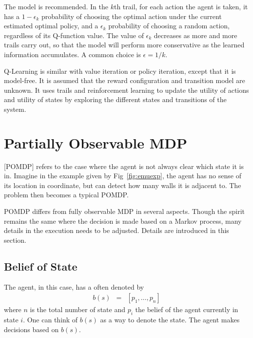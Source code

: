 The  model is recommended. In the $k$th trail, for each action the agent is taken, it has a $1-\epsilon_k$ probability of choosing the optimal action under the current estimated optimal policy, and a $\epsilon_k$ probability of choosing a random action, regardless of its Q-function value. The value of $\epsilon_k$ decreases as more and more trails carry out, so that the model will perform more conservative as the learned information accumulates. A common choice is $\epsilon = 1/k$.

Q-Learning is similar with value iteration or policy iteration, except that it is model-free. It is assumed that the reward configuration and transition model are unknown. It uses trails and reinforcement learning to update the utility of actions and utility of states by exploring the different states and transitions of the system.

\section{Partially Observable MDP} \label{sec:pomdp}

[POMDP] refers to the case where the agent is not always clear which state it is in. Imagine in the example given by Fig~\ref{fig:emuexp}, the agent has no sense of its location in coordinate, but can detect how many walls it is adjacent to. The problem then becomes a typical POMDP. 

POMDP differs from fully observable MDP in several aspects. Though the spirit remains the same where the decision is made based on a Markov process, many details in the execution needs to be adjusted. Details are introduced in this section.

\subsection{Belief of State}

The agent, in this case, has a  often denoted by
\begin{eqnarray}
	b(s) &=& \left[p_1, \ldots, p_n\right] \nonumber
\end{eqnarray}
where $n$ is the total number of state and $p_i$ the belief of the agent currently in state $i$. One can think of $b(s)$ as a way to denote the state. The agent makes decisions based on $b(s)$.

